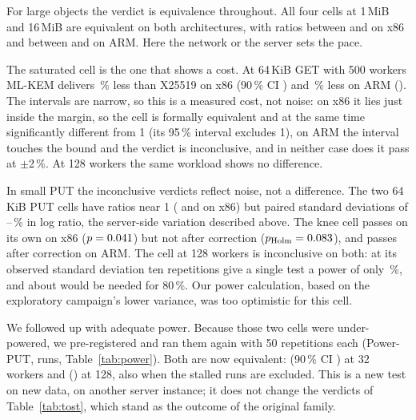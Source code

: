 \documentclass[conference]{IEEEtran}
\newcommand{\lab}[1]{\textsf{#1}}
\begin{document}
For large objects the verdict is equivalence throughout. All four cells at 1\,MiB and 16\,MiB are equivalent on both architectures,
with ratios between \RevLargeRatioLo{} and \RevLargeRatioHi{} on x86 and between
\ArmLargeRatioLo{} and \ArmLargeRatioHi{} on ARM. Here the network or the server sets the pace.

The saturated cell is the one that shows a cost. At 64\,KiB GET with 500 workers
ML-KEM delivers \RevHotDeficit\,\% less than X25519 on x86 (90\,\% CI \RevHotCI) and
\ArmHotDeficit\,\% less on ARM (\ArmHotCI). The intervals are narrow, so this is a measured
cost, not noise: on x86 it lies just inside the margin, so the cell is formally equivalent and at
the same time significantly different from 1 (its 95\,\% interval excludes 1), on ARM the
interval touches the bound and the verdict is inconclusive, and in neither case does it pass at
$\pm$2\,\%. At 128 workers the same workload shows no difference.

In small PUT the inconclusive verdicts reflect noise, not a difference. The two 64\,KiB PUT cells have ratios near 1
(\RevNoisyRatio{} and \RevKneeRatio{} on x86) but paired standard deviations of
\RevKneeSd--\ArmNoisySd\,\% in log ratio, the server-side variation described
above. The knee cell passes on its own on x86 ($p=0.041$) but not after
correction ($p_{\text{Holm}}=0.083$), and passes after correction on ARM. The cell at 128
workers is inconclusive on both: at its observed standard deviation ten repetitions give a single
test a power of only \RevPowerNoisy\,\%, and about \RevPowerNoisyNeeded{} would be needed for
80\,\%. Our power calculation, based on the exploratory campaign's lower variance, was too
optimistic for this cell.

We followed up with adequate power. Because those two cells were under-powered, we
pre-registered and ran them again with 50 repetitions each (\lab{Power-PUT}, \AudKRuns{} runs,
Table~\ref{tab:power}). Both are now equivalent: \AudKKneeRatio{} (90\,\% CI \AudKKneeCI) at 32
workers and \AudKSatRatio{} (\AudKSatCI) at 128, also when the \AudKStalls{} stalled runs are
excluded. This is a new test on new data, on another server instance; it does not change the
verdicts of Table~\ref{tab:tost}, which stand as the outcome of the original family.

\begin{table}[t]
\caption{\lab{Power-PUT}: the two 64\,KiB PUT cells of the primary family repeated with 50 repetitions. Paired throughput ratio ML-KEM-768/X25519, TOST at $\pm$5\,\%, Holm-adjusted over the two cells; the last column gives the number of pairs and the verdict when stalled runs are excluded.}
\label{tab:power}
\centering\footnotesize
\setlength{\tabcolsep}{3pt}
\resizebox{\columnwidth}{!}{}
\end{table}
\end{document}
